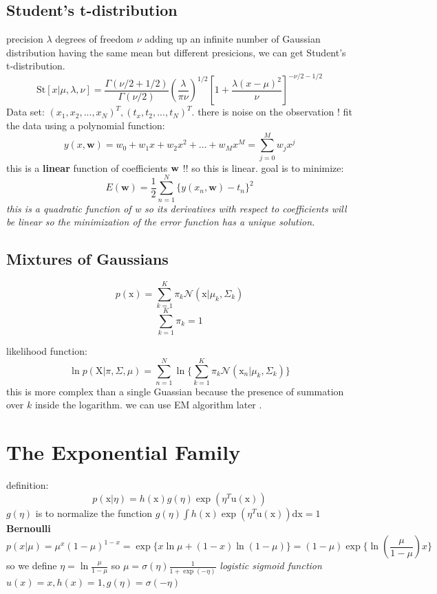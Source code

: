 \documentclass[a4paper]{book}
\begin{document}
\subsection{Student's t-distribution}
precision $\lambda$    degrees of freedom $\nu$\newline
adding up an infinite number of Gaussian distribution having the same mean but different presicions, we can get Student's t-distribution.
$$\mathrm {St}[x|\mu,\lambda,\nu] = \frac{\Gamma(\nu/2+1/2)}{\Gamma(\nu/2)}{(\frac{\lambda}{\pi\nu})^{1/2}}[1+\frac{\lambda(x-\mu)^2}{\nu}]^{-\nu/2-1/2}$$
Data set: $(x_1,x_2,...,x_N)^T, (t_x,t_2,...,t_N)^T$.\newline
there is noise on the observation !
fit the data using a polynomial function:
\begin{equation}\label{2.1}
y(x, \textbf{w}) = w_0+w_1x+w_2x^2+\dots+w_Mx^M=\sum_{j=0}^Mw_jx^j
\end{equation}
this is a \textbf{linear} function of coefficients $\bf{w}$  !! so this is linear.
goal is to minimize:
\begin{equation}\label{2.2}
E(\textbf{w}) = \frac12\sum_{n=1}^N\{y(x_n,\textbf{w})-t_n\}^2
\end{equation}
\textit{this is a quadratic function of w so its derivatives with respect to coefficients will be linear so the minimization of the error function has a unique solution.}
\subsection{Mixtures of Gaussians}
$$p(\mathrm x) = \sum_{k=1}^K\pi_k\mathcal N(\mathrm x|\mu_k, \Sigma_k)$$
$$\sum_{k=1}^K \pi_k= 1$$

likelihood function:
$$\ln p(\mathrm X|\pi,\Sigma,\mu) = \sum_{n=1}^N\ln\{\sum_{k=1}^K\pi_k\mathcal N(\mathrm x_n|\mu_k,\Sigma_k)\}$$
this is more complex than a single Guassian because the presence of summation over $k$ inside the logarithm.  we can use EM algorithm later .

\section{The Exponential Family}
definition:
\begin{equation}\label{eq1.4.1}
  p(\mathrm x|\eta) = h(\mathrm x)g(\eta)\exp(\eta^T\mathrm u(\mathrm x))
\end{equation}
$g(\eta)$ is to normalize the function $g(\eta) \int h(\mathrm x)\exp(\eta^T\mathrm u(\mathrm x))\mathrm {dx} = 1$\newline
\textbf{Bernoulli}
\begin{equation}\label{1.4.2}
  p(x|\mu) =  \mu^x(1-\mu)^{1-x} = \exp\{x\ln\mu+(1-x)\ln(1-\mu)\} = (1-\mu)\exp\{\ln(\frac{\mu}{1-\mu})x\}
\end{equation}
so we define $\eta = \ln\frac{\mu}{1-\mu}$ so $\mu = \sigma(\eta) \frac{1}{1+\exp(-\eta)}$ \emph{logistic sigmoid function}
$u(x) = x, h(x) = 1, g(\eta) = \sigma(-\eta)$
\end{document}
